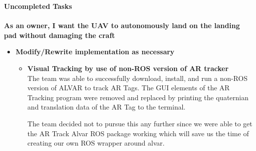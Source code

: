 \vspace{5mm}
\noindent \Large{\textbf{Uncompleted Tasks}}\\
\vspace{2mm}\\
\noindent \large{\textbf{As an owner, I want the UAV to autonomously land on the landing pad without damaging the craft}}
\normalsize
\begin{itemize}
\item \textbf{Modify/Rewrite implementation as necessary}
\begin{itemize}
\item \textbf{Visual Tracking by use of non-ROS version of AR tracker}\\
The team was able to successfully download, install, and run a non-ROS version of ALVAR to track AR Tags. The GUI elements of the AR Tracking program were removed and replaced by printing the quaternian and translation data of the AR Tag to the terminal.\par
The team decided not to pursue this any further since we were able to get the AR Track Alvar ROS package working which will save us the time of creating our own ROS wrapper around alvar.\par


\end{itemize}
\end{itemize}
